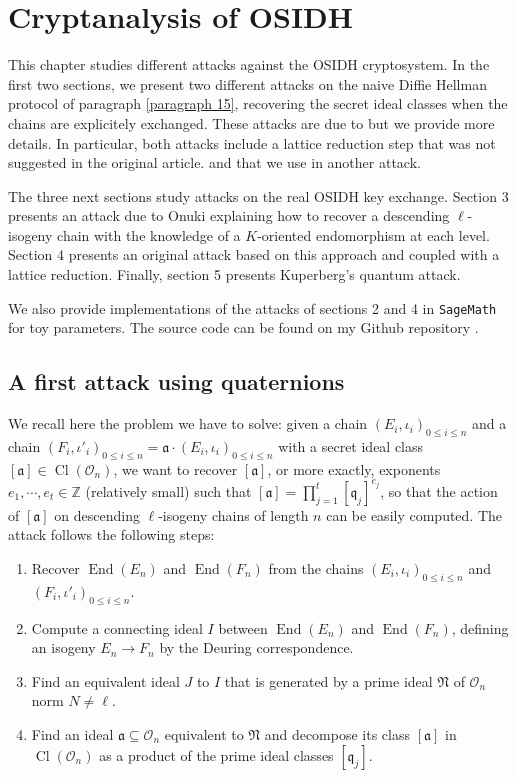 \documentclass[a4paper,10pt]{report}
\theoremstyle{definition}
\theoremstyle{plain}
\theoremstyle{definition}
\newcommand{\Z}{\mathbb{Z}}
\newcommand{\mO}{\mathcal{O}}
\renewcommand{\(}{\left(}
\renewcommand{\)}{\right)}
\newcommand{\mf}[1]{\mathfrak{#1}}
\DeclareMathOperator{\End}{End}
\DeclareMathOperator{\Cl}{Cl}
\begin{document}
\chapter{Cryptanalysis of OSIDH}

This chapter studies different attacks against the OSIDH cryptosystem. In the first two sections, we present two different attacks on the naive Diffie Hellman protocol of paragraph \ref{paragraph 15}, recovering the secret ideal classes when the chains are explicitely exchanged. These attacks are due to \cite[§ 5.1]{OSIDH} but we provide more details.  In particular, both attacks include a lattice reduction step that was not suggested in the original article. and that we use in another attack. 

The three next sections study attacks on the real OSIDH key exchange. Section 3 presents an attack due to Onuki explaining how to recover a descending $\ell$-isogeny chain with the knowledge of a $K$-oriented endomorphism at each level. Section 4 presents an original attack based on this approach and coupled with a lattice reduction. Finally, section 5 presents Kuperberg's quantum attack.

We also provide implementations of the attacks of sections 2 and 4 in \verb?SageMath? \cite{sagemath} for toy parameters. The source code can be found on my Github repository \cite{MyGithub}.

\section{A first attack using quaternions}\label{paragraph 7}

We recall here the problem we have to solve: given a chain $(E_i,\iota_i)_{0\leq i\leq n}$ and a chain $(F_i,\iota'_i)_{0\leq i\leq n}=\mf{a}\cdot(E_i,\iota_i)_{0\leq i\leq n}$ with a secret ideal class $[\mf{a}]\in\Cl(\mO_n)$, we want to recover $[\mf{a}]$, or more exactly, exponents $e_1,\cdots, e_t\in\Z$ (relatively small) such that $[\mf{a}]=\prod_{j=1}^t[\mf{q}_j]^{e_j}$, so that the action of $[\mf{a}]$ on descending $\ell$-isogeny chains of length $n$ can be easily computed. The attack follows the following steps:
\begin{enumerate}
\item Recover $\End(E_n)$ and $\End(F_n)$ from the chains $(E_i,\iota_i)_{0\leq i\leq n}$ and $(F_i,\iota'_i)_{0\leq i\leq n}$.
\item Compute a connecting ideal $I$ between $\End(E_n)$ and $\End(F_n)$, defining an isogeny $E_n\longrightarrow F_n$ by the Deuring correspondence.
\item Find an equivalent ideal $J$ to $I$ that is generated by a prime ideal $\mf{N}$ of $\mO_n$ norm $N\neq\ell$.
\item Find an ideal $\mf{a}\subseteq \mO_n$ equivalent to $\mf{N}$ and decompose its class $[\mf{a}]$ in $\Cl(\mO_n)$ as a product of the prime ideal classes $[\mf{q}_j]$.
\end{enumerate}
\end{document}
